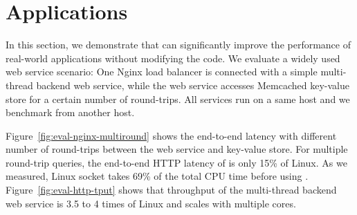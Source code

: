 \section{Applications}
\label{sec:application}

In this section, we demonstrate that \sys{} can significantly improve the performance of real-world applications without modifying the code.
We evaluate a widely used web service scenario: One Nginx load balancer is connected with a simple multi-thread backend web service, while the web service accesses Memcached key-value store for a certain number of round-trips. All services run on a same host and we benchmark from another host.

Figure~\ref{fig:eval-nginx-multiround} shows the end-to-end latency with different number of round-trips between the web service and key-value store.
For multiple round-trip queries, the end-to-end HTTP latency of \sys{} is only 15\% of Linux.
As we measured, Linux socket takes 69\% of the total CPU time before using \libipc.
Figure~\ref{fig:eval-http-tput} shows that \sys{} throughput of the multi-thread backend web service is 3.5 to 4 times of Linux and scales with multiple cores.











